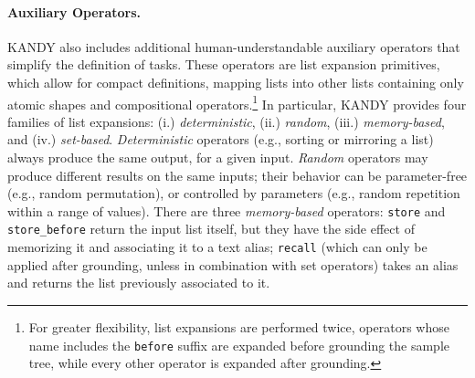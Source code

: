 \paragraph{Auxiliary Operators.}
%
%
\textsc{KANDY} also includes additional human-understandable auxiliary operators that simplify the definition of tasks.
%
These operators are list expansion primitives, which allow for compact definitions, mapping lists into other lists containing only atomic shapes and compositional operators.\footnote{For greater flexibility, list expansions are performed twice, operators whose name includes the \texttt{before} suffix are expanded before grounding the sample tree, while every other operator is expanded after grounding.}
%
In particular, KANDY provides four families of list expansions: (i.) \textit{deterministic}, (ii.) \textit{random}, (iii.) \textit{memory-based}, and (iv.) \textit{set-based}. %
%
\textit{Deterministic} operators (e.g., sorting or mirroring a list) always produce the same output, for a given input. %
%
\textit{Random} operators may produce different results on the same inputs; their behavior can be parameter-free (e.g., random permutation), or controlled by parameters (e.g., random repetition within a range of values).
%
There are three \textit{memory-based} operators: \texttt{store} and \texttt{store\_before} return the input list itself, but they have the side effect of memorizing it and associating it to a text alias; \texttt{recall} (which can only be applied after grounding, unless in combination with set operators) takes an alias and returns the list previously associated to it.

